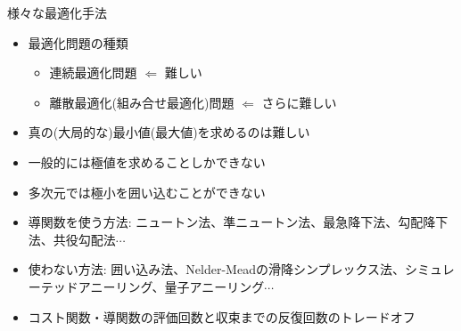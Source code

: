 \begin{frame}[t,fragile]{様々な最適化手法}
  \begin{itemize}
  \item 最適化問題の種類
    \begin{itemize}
    \item 連続最適化問題 $\Leftarrow$ 難しい
    \item 離散最適化(組み合せ最適化)問題 $\Leftarrow$ さらに難しい
    \end{itemize}
  \item 真の(大局的な)最小値(最大値)を求めるのは難しい
  \item 一般的には極値を求めることしかできない
  \item 多次元では極小を囲い込むことができない
  \item 導関数を使う方法: ニュートン法、準ニュートン法、最急降下法、勾配降下法、共役勾配法$\cdots$
  \item 使わない方法: 囲い込み法、Nelder-Meadの滑降シンプレックス法、シミュレーテッドアニーリング、量子アニーリング$\cdots$
  \item コスト関数・導関数の評価回数と収束までの反復回数のトレードオフ
  \end{itemize}
\end{frame}

